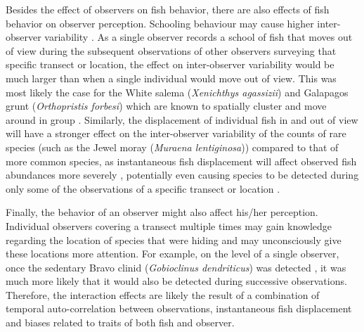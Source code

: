 \documentclass[10pt,letterpaper]{article}
\begin{document}
Besides the effect of observers on fish behavior, there are also effects of fish behavior on observer perception. Schooling behaviour may cause higher inter-observer variability \cite{Kulbicki1998,McClanahan2007}. As a single observer records a school of fish that moves out of view during the subsequent observations of other observers surveying that specific transect or location, the effect on inter-observer variability would be much larger than when a single individual would move out of view. This was most likely the case for the White salema (\textit{Xenichthys agassizii}) and Galapagos grunt (\textit{Orthopristis forbesi}) which are known to spatially cluster and move around in group \cite{Humann2003ReefGalapagos}. Similarly, the displacement of individual fish in and out of view will have a stronger effect on the inter-observer variability of the counts of rare species (such as the Jewel moray (\textit{Muraena lentiginosa})) compared to that of more common species, as instantaneous fish displacement will affect observed fish abundances more severely \cite{Humann2003ReefGalapagos}, potentially even causing species to be detected during only some of the observations of a specific transect or location \cite{Boulinier1998}. 

Finally, the behavior of an observer might also affect his/her perception. Individual observers covering a transect multiple times may gain knowledge regarding the location of species that were hiding and may unconsciously give these locations more attention. For example, on the level of a single observer, once the sedentary Bravo clinid (\textit{Gobioclinus dendriticus}) was detected \cite{Humann2003ReefGalapagos}, it was much more likely that it would also be detected during successive observations. Therefore, the interaction effects are likely the result of a combination of temporal auto-correlation between observations, instantaneous fish displacement and biases related to traits of both fish and observer. 
\end{document}
